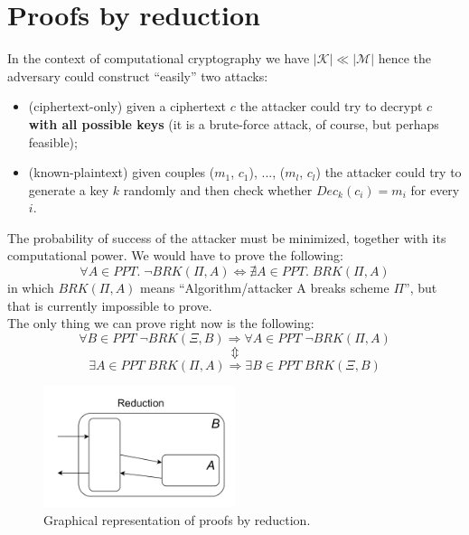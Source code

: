 \documentclass[../main]{subfiles}
\begin{document}
\section{Proofs by reduction}

In the context of computational cryptography we have $|\mathcal{K}| \ll{} |\mathcal{M}|$ hence the adversary could construct ``easily'' two attacks:
\begin{itemize}
    \item (ciphertext-only) given a ciphertext $c$ the attacker could try to decrypt $c$ \textbf{with all possible keys} (it is a brute-force attack, of course, but perhaps feasible);
    \item (known-plaintext) given couples ($m_1$, $c_1$), ..., ($m_l$, $c_l$) the attacker could try to generate a key $k$ randomly and then check whether $Dec_k(c_i) = m_i$ for every $i$.
\end{itemize}
The probability of success of the attacker must be minimized, together with its computational power.
We would have to prove the following:
$$\forall{} A \in{} PPT. \; \neg BRK(\Pi, A) \Leftrightarrow{} \nexists{} A \in{} PPT. \;  BRK(\Pi, A)$$
in which $BRK(\Pi, A)$ means ``Algorithm/attacker A breaks scheme $\Pi$'', but that is currently impossible to prove.\\
The only thing we can prove right now is the following:
$$\forall{} B \in{} PPT \; \neg BRK(\Xi, B) \Rightarrow{} \forall{} A \in{} PPT \; \neg BRK(\Pi, A)$$
$$\Updownarrow$$
$$\exists{} A \in{} PPT \; BRK(\Pi, A) \Rightarrow{} \exists{} B \in{} PPT \; BRK(\Xi, B)$$
\begin{figure}[h]
    \centering
    \includegraphics[width=0.5\textwidth]{images/reduction}
    \caption{Graphical representation of proofs by reduction.}
\end{figure}
\end{document}
